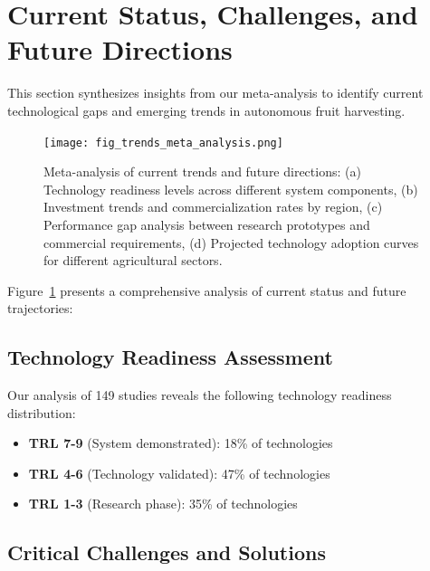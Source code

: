 \documentclass[a4paper,fleqn]{cas-dc}
\begin{document}
\section{Current Status, Challenges, and Future Directions}

This section synthesizes insights from our meta-analysis to identify current technological gaps and emerging trends in autonomous fruit harvesting.

\begin{figure}[h!]
    \centering
    \texttt{[image: fig\_trends\_meta\_analysis.png]}
    \caption{Meta-analysis of current trends and future directions: (a) Technology readiness levels across different system components, (b) Investment trends and commercialization rates by region, (c) Performance gap analysis between research prototypes and commercial requirements, (d) Projected technology adoption curves for different agricultural sectors.}
    \label{fig:trends_meta}
\end{figure}

Figure~\ref{fig:trends_meta} presents a comprehensive analysis of current status and future trajectories:

\subsection{Technology Readiness Assessment}

Our analysis of 149 studies reveals the following technology readiness distribution:
\begin{itemize}
\item \textbf{TRL 7-9} (System demonstrated): 18\% of technologies
\item \textbf{TRL 4-6} (Technology validated): 47\% of technologies
\item \textbf{TRL 1-3} (Research phase): 35\% of technologies
\end{itemize}

\subsection{Critical Challenges and Solutions}
\end{document}
